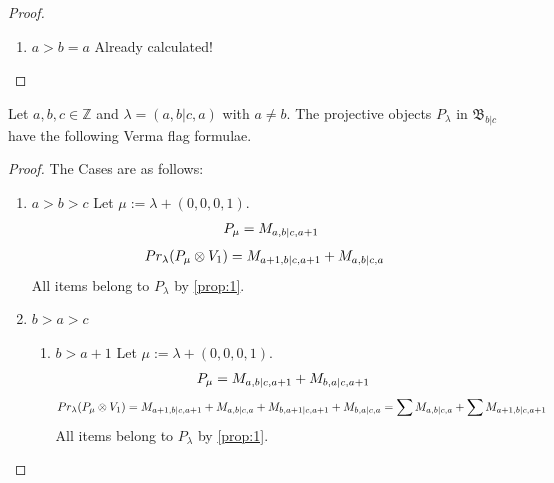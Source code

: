 \begin{proof}
\begin{enumerate}
\item $a>b=a$ Already calculated!

\end{enumerate}
\end{proof}



\begin{theorem}
  Let $a,b,c \in \mathbb{Z}$ and $\lambda = (a,b|c,a)$ with $a \neq b$. The projective objects $P_{\lambda}$ in $\mathfrak{B}_{b|c}$ have the following Verma flag formulae.
\end{theorem}
\begin{proof} The Cases are as follows:\par
\begin{enumerate}

\item $a>b>c$
        Let $\mu:=\lambda + (0,0,0,1) $. 
\begin{equation}\notag
  \begin{aligned}
      P_{\mu} = M_{a,b|c,a+1}
  \end{aligned}
\end{equation}
\begin{equation}\notag
  \begin{aligned}
  Pr_{\lambda}(P_\mu \otimes V_1) &=
M_{a+1,b|c,a+1}
+M_{a,b|c,a}
  \end{aligned}
\end{equation}
All items belong to $P_\lambda$ by \cref{prop:1}.

\item $b>a>c$
  \begin{enumerate}
    \item $b>a+1$
        Let $\mu:=\lambda + (0,0,0,1) $. 
\begin{equation}\notag
  \begin{aligned}
      P_{\mu} =
M_{a,b|c,a+1}
+M_{b,a|c,a+1}
  \end{aligned}
\end{equation}
\begin{equation}\notag
  \begin{aligned}
  Pr_{\lambda}(P_\mu \otimes V_1) &=
M_{a+1,b|c,a+1}
+M_{a,b|c,a}
+M_{b,a+1|c,a+1}
+M_{b,a|c,a}
                                  =
\sum M_{a,b|c,a}
+\sum M_{a+1,b|c,a+1}
  \end{aligned}
\end{equation}
All items belong to $P_\lambda$ by \cref{prop:1}.
    

\end{enumerate}
\end{enumerate}
\end{proof}
